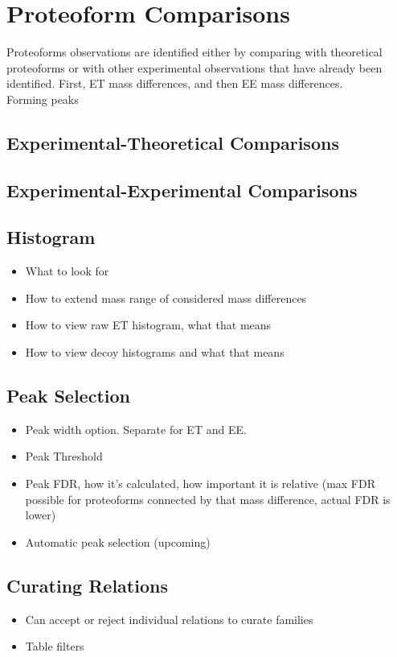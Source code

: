 
\section{Proteoform Comparisons}
Proteoforms observations are identified either by comparing with theoretical proteoforms or with other experimental observations that have already been identified. First, ET mass differences, and then EE mass differences.
\\

Forming peaks

\subsection{Experimental-Theoretical Comparisons}
\subsection{Experimental-Experimental Comparisons}

\subsection{Histogram}
\begin{itemize}
	\item What to look for
	\item How to extend mass range of considered mass differences
	\item How to view raw ET histogram, what that means
	\item How to view decoy histograms and what that means
\end{itemize}

\subsection{Peak Selection}
\begin{itemize}
	\item Peak width option. Separate for ET and EE.
	\item Peak Threshold
	\item Peak FDR, how it's calculated, how important it is relative (max FDR possible for proteoforms connected by that mass difference, actual FDR is lower)
	\item Automatic peak selection (upcoming)
\end{itemize}

\subsection{Curating Relations}
\begin{itemize}
	\item Can accept or reject individual relations to curate families
	\item Table filters
\end{itemize}



